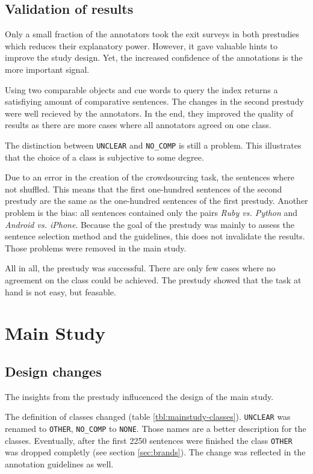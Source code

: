 \subsection{Validation of results}
Only a small fraction of the annotators took the exit surveys in both prestudies which reduces their explanatory power. However, it gave valuable hints to improve the study design. Yet, the increased confidence of the annotations is the more important signal.

Using two comparable objects and cue words to query the index returns a satisfiying amount of comparative sentences. The changes in the second prestudy were well recieved by the annotators. In the end, they improved the quality of results as there are more cases where all annotators agreed on one class.


The distinction between \texttt{UNCLEAR} and \texttt{NO\_COMP} is still a problem. This illustrates that the choice of a class is subjective to some degree. 

Due to an error in the creation of the crowdsourcing task, the sentences where not shuffled. This means that the first one-hundred sentences of the second prestudy are the same as the one-hundred sentences of the first prestudy. Another problem is the bias: all sentences contained only the pairs \emph{Ruby vs. Python} and \emph{Android vs. iPhone}. Because the goal of the prestudy was mainly to assess the sentence selection method and the guidelines, this does not invalidate the results. Those problems were removed in the main study.
\hfill\newline

All in all, the prestudy was successful. There are only few cases where no agreement on the class could be achieved. The prestudy showed that the task at hand is not easy, but feasable.

\newpage
\section{Main Study}
\label{sec:mainstudy}
\subsection{Design changes}
\label{sec:designchanges}
The insights from the prestudy influcenced the design of the main study.

The definition of classes changed (table \ref{tbl:mainstudy-classes}). \texttt{UNCLEAR} was renamed to \texttt{OTHER}, \texttt{NO\_COMP} to \texttt{NONE}. Those names are a better description for the classes. Eventually, after the first 2250 sentences were finished the class \texttt{OTHER} was dropped completly (see section \ref{sec:brands}). The change was reflected in the annotation guidelines as well. 

